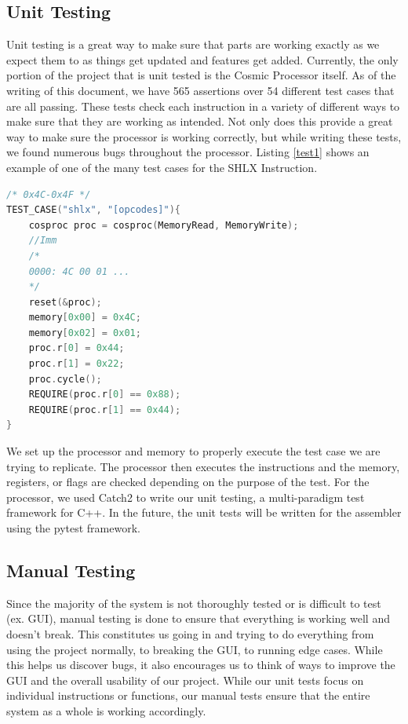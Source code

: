 \documentclass[conference]{IEEEtran}
\begin{document}
\subsection{Unit Testing}
Unit testing is a great way to make sure that parts are working exactly as we expect them to as things get updated and features get added. Currently, the only portion of the project that is unit tested is the Cosmic Processor itself. As of the writing of this document, we have 565 assertions over 54 different test cases that are all passing. These tests check each instruction in a variety of different ways to make sure that they are working as intended. Not only does this provide a great way to make sure the processor is working correctly, but while writing these tests, we found numerous bugs throughout the processor. Listing \ref{test1} shows an example of one of the many test cases for the SHLX Instruction. 
\begin{lstlisting}[language={C++}, caption={A unit test for the SHLX instruction.}, label = {test1}]
/* 0x4C-0x4F */
TEST_CASE("shlx", "[opcodes]"){
    cosproc proc = cosproc(MemoryRead, MemoryWrite);
    //Imm
    /*
    0000: 4C 00 01 ...
    */
    reset(&proc);
    memory[0x00] = 0x4C;
    memory[0x02] = 0x01;
    proc.r[0] = 0x44;
    proc.r[1] = 0x22;
    proc.cycle();
    REQUIRE(proc.r[0] == 0x88);
    REQUIRE(proc.r[1] == 0x44);
}
\end{lstlisting}

We set up the processor and memory to properly execute the test case we are trying to replicate. The processor then executes the instructions and the memory, registers, or flags are checked depending on the purpose of the test. For the processor, we used Catch2 to write our unit testing, a multi-paradigm test framework for C++. In the future, the unit tests will be written for the assembler using the pytest framework.

\subsection{Manual Testing}
Since the majority of the system is not thoroughly tested or is difficult to test (ex. GUI), manual testing is done to ensure that everything is working well and doesn't break. This constitutes us going in and trying to do everything from using the project normally, to breaking the GUI, to running edge cases. While this helps us discover bugs, it also encourages us to think of ways to improve the GUI and the overall usability of our project. While our unit tests focus on individual instructions or functions, our manual tests ensure that the entire system as a whole is working accordingly.
\end{document}

